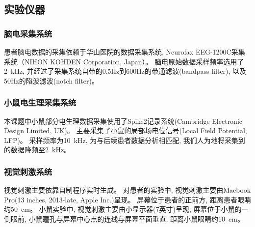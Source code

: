 \subsection{实验仪器}

\subsubsection{脑电采集系统}
患者脑电数据的采集依赖于华山医院的数据采集系统,
Neurofax EEG-1200C采集系统（NIHON KOHDEN Corporation, Japan）。
脑电原始数据采样频率选用了2~kHz, 并经过了采集系统自带的0.5Hz到600Hz的带通滤波(bandpass filter),
以及50Hz的陷波滤波(notch filter)。

\subsubsection{小鼠电生理采集系统}
本课题中小鼠部分电生理数据采集使用了Spike2记录系统(Cambridge Electronic Design Limited, UK)。
主要采集了小鼠的局部场电位信号(Local Field Potential, LFP)。
采样频率为10~kHz, 为与后续患者数据分析相匹配,
我们人为地将采集到的数据降频至2~kHz。

\subsubsection{视觉刺激系统}
视觉刺激主要依靠自制程序实时生成。
对患者的实验中, 视觉刺激主要由Macbook Pro(13 inches, 2013-late, Apple Inc.)呈现。
屏幕位于患者的正前方, 距离患者眼睛约50~cm。
小鼠实验中, 视觉刺激主要由小显示器(7英寸)呈现, 屏幕位于小鼠的一侧眼前,
小鼠瞳孔与屏幕中心点的连线与屏幕平面垂直, 距离小鼠眼睛约10~cm。
